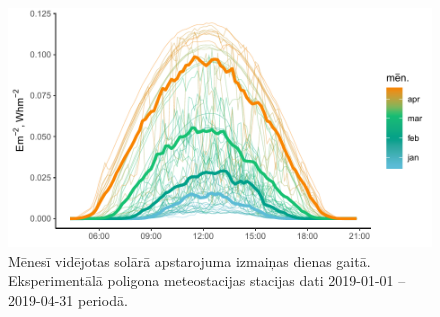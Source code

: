 \begin{figure}[h]
    \centering
    \includegraphics[width=\linewidth]{figures/meteo/mean19.pdf}
    \caption{Mēnesī vidējotas solārā apstarojuma izmaiņas dienas gaitā. Eksperimentālā poligona meteostacijas stacijas dati 2019-01-01 -- 2019-04-31 periodā.}
    \label{fig:met_Irrad_mean}
\end{figure}
